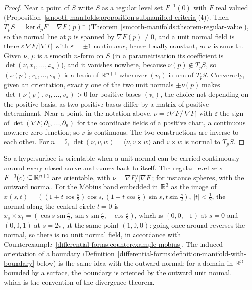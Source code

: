 \begin{proof}
Near a point of $S$ write $S$ as a regular level set $F^{-1}(0)$ with $F$ real valued (Proposition~\ref{smooth-manifolds:proposition-submanifold-criteria}(4)). Then
$T_pS = \ker d_pF = \nabla F(p)^\perp$ (Theorem~\ref{smooth-manifolds:theorem-regular-value}), so the normal line at $p$ is spanned by $\nabla F(p) \neq 0$, and a unit normal field
is there $\varepsilon\,\nabla F/|\nabla F|$ with $\varepsilon = \pm1$ continuous, hence locally constant; so $\nu$ is smooth. Given $\nu$, $\mu$ is a smooth $n$-form on $S$ (in a
parametrisation its coefficient is $\det(\nu, x_1, \ldots, x_n)$), and it vanishes nowhere, because $\nu(p) \notin T_pS$, so $(\nu(p), v_1, \ldots, v_n)$ is a basis of $\mathbb{R}^{n+1}$
whenever $(v_i)$ is one of $T_pS$. Conversely, given an orientation, exactly one of the two unit normals $\pm\nu(p)$ makes $\det(\nu(p), v_1, \ldots, v_n) > 0$ for positive bases
$(v_i)$, the choice not depending on the positive basis, as two positive bases differ by a matrix of positive determinant. Near a point, in the notation above,
$\nu = \varepsilon\nabla F/|\nabla F|$ with $\varepsilon$ the sign of $\det(\nabla F, \partial_1, \ldots, \partial_n)$ for the coordinate fields of a positive chart, a continuous nowhere zero
function; so $\nu$ is continuous. The two constructions are inverse to each other. For $n = 2$, $\det(\nu, v, w) = \langle\nu, v \times w\rangle$ and $v \times w$ is normal to
$T_pS$.
\end{proof}

\begin{remark}\label{differential-forms:remark-moving-normal}
So a hypersurface is orientable when a unit normal can be carried continuously around every closed curve and comes back to itself. The regular level sets
$F^{-1}(c) \subseteq \mathbb{R}^{n+1}$ are orientable, with $\nu = \nabla F/|\nabla F|$; for instance spheres, with the outward normal. For the M\"obius band embedded in
$\mathbb{R}^3$ as the image of $x(s, t) = ((1 + t\cos\frac s2)\cos s, (1 + t\cos\frac s2)\sin s, t\sin\frac s2)$, $|t| < \frac12$, the normal along the central circle $t = 0$ is
$x_s \times x_t = (\cos s\sin\frac s2, \sin s\sin\frac s2, -\cos\frac s2)$, which is $(0, 0, -1)$ at $s = 0$ and $(0, 0, 1)$ at $s = 2\pi$, at the same point $(1, 0, 0)$: going once
around reverses the normal, so there is no unit normal field, in accordance with Counterexample~\ref{differential-forms:counterexample-mobius}. The induced orientation of a
boundary (Definition~\ref{differential-forms:definition-manifold-with-boundary} below) is the same idea with the outward normal: for a domain in $\mathbb{R}^3$ bounded by a surface, the boundary
is oriented by the outward unit normal, which is the convention of the divergence theorem.
\end{remark}

